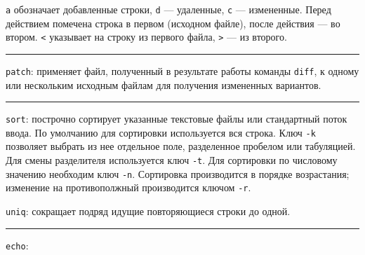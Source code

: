 \documentclass[listings]{labreport}
\begin{document}
\texttt{a} обозначает добавленные строки, \texttt{d} — удаленные, \texttt{c} —
измененные. Перед действием помечена строка в первом (исходном файле),
после действия — во втором. \texttt{<} указывает на строку из первого файла,
\texttt{>} — из второго.

\noindent\rule{\textwidth}{1pt}

\texttt{patch}: применяет файл, полученный в результате работы команды \texttt{diff},
к одному или нескольким исходным файлам для получения измененных вариантов.

\noindent\rule{\textwidth}{1pt}

\texttt{sort}: построчно сортирует указанные текстовые файлы или стандартный поток ввода.
По умолчанию для сортировки используется вся строка. Ключ \texttt{-k} позволяет
выбрать из нее отдельное поле, разделенное пробелом или табуляцией. Для смены разделителя
используется ключ \texttt{-t}. Для сортировки по числовому значению необходим ключ \texttt{-n}.
Сортировка производится в порядке возрастания; изменение на противополжный производится ключом \texttt{-r}.

\texttt{uniq}: сокращает подряд идущие повторяющиеся строки до одной.

\noindent\rule{\textwidth}{1pt}

\texttt{echo}:
\end{document}
